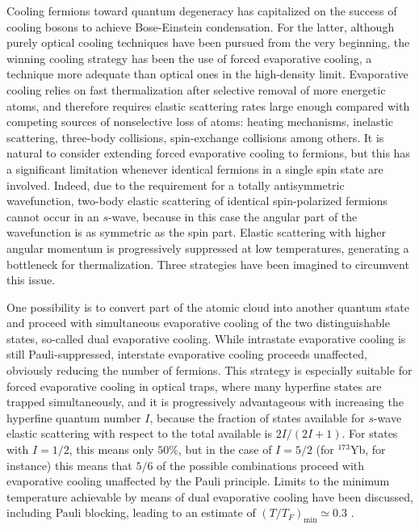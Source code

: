 \documentclass[pra,letterpaper,twocolumn,showpacs,superscriptaddress]{revtex4}
\begin{document}
Cooling fermions toward quantum degeneracy has capitalized on the success of cooling bosons to achieve Bose-Einstein condensation. 
For the latter, although purely optical cooling techniques have been pursued from the very beginning, the winning cooling strategy 
has been the use of forced evaporative cooling, a technique more adequate than optical ones in the high-density limit. 
Evaporative cooling relies on fast thermalization after selective removal of more energetic atoms, and therefore requires 
elastic scattering rates large enough compared with competing sources of nonselective loss of atoms: heating 
mechanisms, inelastic scattering, three-body collisions, spin-exchange collisions among others. 
It is natural to consider extending forced evaporative cooling to fermions, but this has a significant limitation 
whenever identical fermions in a single spin state are involved. Indeed, due to the requirement for a totally 
antisymmetric wavefunction, two-body elastic scattering of identical spin-polarized fermions cannot occur 
in an $s$-wave, because in this case the angular part of the wavefunction is as symmetric as the spin part. 
Elastic scattering with higher angular momentum is progressively suppressed at low temperatures, generating  
a bottleneck for thermalization. Three strategies have been imagined to circumvent this issue. 

One possibility is to convert part of the atomic cloud  into another quantum state and proceed with simultaneous evaporative cooling 
of the two distinguishable states, so-called dual evaporative cooling. While intrastate evaporative cooling is still Pauli-suppressed, interstate 
evaporative cooling proceeds unaffected, obviously reducing the number of fermions. 
This strategy is especially suitable for forced evaporative cooling in optical traps, where many hyperfine states are 
trapped simultaneously, and it is progressively advantageous with increasing the hyperfine quantum number $I$, because  
the fraction of states available for $s$-wave elastic scattering with respect to the total available is $2I/(2I+1)$. 
For states with $I=1/2$, this means only $50 \%$, but in the case of $I=5/2$ (for ${}^{173}$Yb, for instance) this means 
that $5/6$ of the possible combinations proceed with evaporative cooling unaffected by the Pauli principle.  
Limits to the minimum temperature achievable by means of dual evaporative cooling have been discussed, including Pauli blocking, 
leading to an estimate of $(T/T_F)_{\mathrm{min}} \simeq 0.3$ \cite{Crescimanno2000,Holland2000}.
\end{document}
